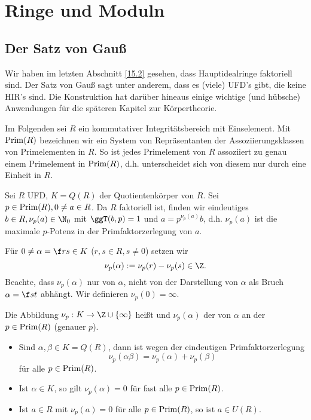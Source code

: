 \chapter{Ringe und Moduln}


\setcounter{section}{2}
\section{Der Satz von Gauß}

Wir haben im letzten Abschnitt \ref{15.2} gesehen, dass Hauptidealringe faktoriell sind.
Der Satz von Gauß sagt unter anderem, dass es (viele) UFD's gibt, die keine HIR's sind.
Die Konstruktion hat darüber hineaus einige wichtige (und hübsche) Anwendungen für die späteren Kapitel zur Körpertheorie.

Im Folgenden sei $R$ ein kommutativer Integritätsbereich mit Einselement.
Mit $\operatorname{Prim}(R)$ bezeichnen wir ein System von Repräsentanten der Assoziierungsklassen von Primelementen in $R$.
So ist jedes Primelement von $R$ assoziiert zu genau einem Primelement in $\operatorname{Prim}(R)$, d.h. unterscheidet sich von diesem nur durch eine Einheit in $R$.

\begin{df} \label{15.3-1}
	Sei $R$ UFD, $K = Q(R)$ der Quotientenkörper von $R$.
	Sei $p \in \operatorname{Prim}(R), 0 \neq a \in R$.
	Da $R$ faktoriell ist, finden wir eindeutiges $b \in R, \nu_p(a) \in \N_0$ mit $\ggT(b,p) = 1$ und $a = p^{\nu_p(a)} b$, d.h. $\nu_p(a)$ ist die maximale $p$-Potenz in der Primfaktorzerlegung von $a$.

	Für $0 \neq \alpha = \f rs \in K$ ($r, s \in R, s \neq 0$) setzen wir
	\[
		\nu_p(\alpha) := \nu_p(r) - \nu_p(s) \in \Z.
	\]
	Beachte, dass $\nu_p(\alpha)$ nur von $\alpha$, nicht von der Darstellung von $\alpha$ als Bruch $\alpha = \f st$ abhängt.
	Wir definieren $\nu_p(0) = \infty$.

	Die Abbildung $\nu_p: K \to \Z \cup \{\infty\}$ heißt  und $\nu_p(\alpha)$ der  von $\alpha$ an der  $p\in \operatorname{Prim}(R)$ (genauer  $p$).

	\begin{note}
		\begin{itemize}
			\item
				Sind $\alpha, \beta \in K = Q(R)$, dann ist wegen der eindeutigen Primfaktorzerlegung
				\[
					\nu_p(\alpha \beta) = \nu_p(\alpha) + \nu_p(\beta)
				\]
				für alle $p \in \operatorname{Prim}(R)$.
			\item
				Ist $\alpha \in K$, so gilt $\nu_p(\alpha) = 0$ für fast alle $p \in \operatorname{Prim}(R)$.
			\item
				Ist $a \in R$ mit $\nu_p(a) = 0$ für alle $p \in \operatorname{Prim}(R)$, so ist $a \in U(R)$.
		\end{itemize}
	\end{note}
\end{df}

